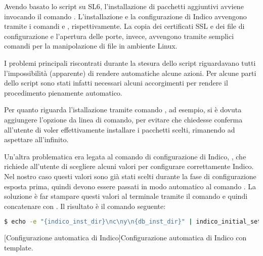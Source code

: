             Avendo basato lo script su \ac{SL6}, l'installazione di pacchetti aggiuntivi avviene invocando il comando . L'installazione e la configurazione di Indico avvengono tramite i comandi  e , rispettivamente. La copia dei certificati \ac{SSL} e dei file di configurazione e l'apertura delle porte, invece, avvengono tramite semplici comandi per la manipolazione di file in ambiente Linux.
            
            I problemi principali riscontrati durante la stesura dello script riguardavano tutti l'impossibilità (apparente) di rendere automatiche alcune azioni. Per alcune parti dello script sono stati infatti necessari alcuni accorgimenti per rendere il procedimento pienamente automatico.
            
            Per quanto riguarda l'istallazione tramite comando , ad esempio, si è dovuta aggiungere l'opzione  da linea di comando, per evitare che  chiedesse conferma all'utente di voler effettivamente installare i pacchetti scelti, rimanendo ad aspettare all'infinito.
            
            Un'altra problematica era legata al comando di configurazione di Indico, , che richiede all'utente di scegliere alcuni valori per configurare correttamente Indico. Nel nostro caso questi valori sono già stati scelti durante la fase di configurazione esposta prima, quindi devono essere passati in modo automatico al comando . La soluzione è far stampare questi valori al terminale tramite il comando  e quindi concatenare  con . Il risultato è il comando seguente:
            
            \begin{center}
                \begin{minipage}{\linewidth}
                    \begin{lstlisting}[language=bash, gobble=22]
                        $ echo -e "{indico_inst_dir}\nc\ny\n{db_inst_dir}" | indico_initial_setup
                    \end{lstlisting}
                    \captionsetup{textformat=empty,labelformat=empty} \vspace{-2em}
                    [Configurazione automatica di Indico]{Configurazione automatica di Indico con template.}
                \end{minipage}
            \end{center}
            
